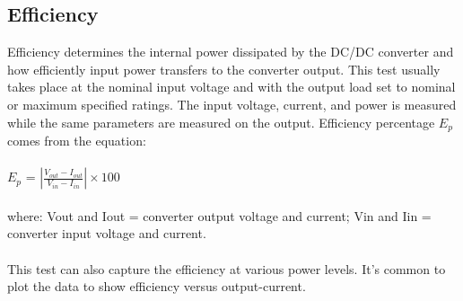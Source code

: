 \subsection{Efficiency} 

Efficiency determines the internal power dissipated by the DC/DC converter and how efficiently input power transfers to the converter output. This test usually takes place at the nominal input voltage and with the output load set to nominal or maximum specified ratings. The input voltage, current, and power is measured while the same parameters are measured on the output. Efficiency percentage $E_{p}$ comes from the equation:
\\ \\
\hspace*{5cm}$E_{p}$ = $\left | \frac{V_{out}-I_{out}}{V_{in}-I_{in}} \right | \times 100$
\\ \\
where:
Vout and Iout = converter output voltage and current;
Vin and Iin = converter input voltage and current.
\\ \\
This test can also capture the efficiency at various power levels. It’s common to plot the data to show efficiency versus output-current.




	







